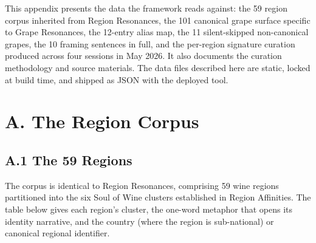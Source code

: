 \documentclass[11pt]{article}
\begin{document}

This appendix presents the data the framework reads against: the 59 region corpus inherited from Region Resonances, the 101 canonical grape surface specific to Grape Resonances, the 12-entry alias map, the 11 silent-skipped non-canonical grapes, the 10 framing sentences in full, and the per-region signature curation produced across four sessions in May 2026. It also documents the curation methodology and source materials. The data files described here are static, locked at build time, and shipped as JSON with the deployed tool.

\section*{A. The Region Corpus}

\subsection*{A.1 The 59 Regions}

The corpus is identical to Region Resonances, comprising 59 wine regions partitioned into the six Soul of Wine clusters established in Region Affinities. The table below gives each region's cluster, the one-word metaphor that opens its identity narrative, and the country (where the region is sub-national) or canonical regional identifier.
\end{document}

